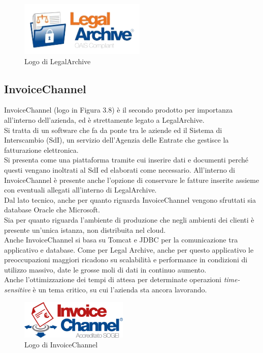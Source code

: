\begin{figure}[htbp]
\begin{center}
\includegraphics[height=7em]{immagini/tecnologies-logos/logo-legal-archive.png}
\caption{Logo di LegalArchive}
\end{center}
\end{figure}

\subsection{InvoiceChannel}
InvoiceChannel (logo in Figura 3.8) è il secondo prodotto per importanza all'interno dell'azienda, ed è strettamente legato a LegalArchive\cite{site:invoicechannel}.\\
Si tratta di un software che fa da ponte tra le aziende ed il Sistema di Interscambio (SdI), un servizio dell'Agenzia delle Entrate che gestisce la fatturazione elettronica.\\
Si presenta come una piattaforma tramite cui inserire dati e documenti perché questi vengano inoltrati al SdI ed elaborati come necessario. All'interno di InvoiceChannel è presente anche l'opzione di conservare le fatture inserite assieme con eventuali allegati all'interno di LegalArchive.\\
Dal lato tecnico, anche per quanto riguarda InvoiceChannel vengono sfruttati sia database Oracle che Microsoft.\\
Sia per quanto riguarda l'ambiente di produzione che negli ambienti dei clienti è presente un'unica istanza, non distribuita nel cloud.\\
Anche InvoiceChannel si basa su \gls{Tomcat} e \gls{JDBC} per la comunicazione tra applicativo e database.
Come per Legal Archive, anche per questo applicativo le preoccupazioni maggiori ricadono su scalabilità e performance in condizioni di utilizzo massivo, date le grosse moli di dati in continuo aumento.\\
Anche l'ottimizzazione dei tempi di attesa per determinate operazioni \textit{time-sensitive} è un tema critico, su cui l'azienda sta ancora lavorando.\\

\begin{figure}[htbp]
\begin{center}
\includegraphics[height=5em]{immagini/tecnologies-logos/logo-invoice-channel.png}
\caption{Logo di InvoiceChannel}
\end{center}
\end{figure}

